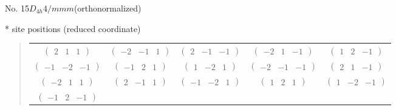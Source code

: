 \documentclass[fleqn,9pt,landscape]{jsarticle}
\begin{document}
\newpage
\begin{center}
\LARGE
No. 15\quad$D_{4h}$\quad$4/mmm$\quad[ tetragonal ] (orthonormalized)
\end{center}
\vspace{5mm}
* site positions (reduced coordinate)
\begin{quote}
\begin{tabular}{ccccc}
$ \begin{pmatrix} 2 & 1 & 1 \end{pmatrix} $ & $ \begin{pmatrix} -2 & -1 & 1 \end{pmatrix} $ & $ \begin{pmatrix} 2 & -1 & -1 \end{pmatrix} $ & $ \begin{pmatrix} -2 & 1 & -1 \end{pmatrix} $ & $ \begin{pmatrix} 1 & 2 & -1 \end{pmatrix} $ \\
$ \begin{pmatrix} -1 & -2 & -1 \end{pmatrix} $ & $ \begin{pmatrix} -1 & 2 & 1 \end{pmatrix} $ & $ \begin{pmatrix} 1 & -2 & 1 \end{pmatrix} $ & $ \begin{pmatrix} -2 & -1 & -1 \end{pmatrix} $ & $ \begin{pmatrix} 2 & 1 & -1 \end{pmatrix} $ \\
$ \begin{pmatrix} -2 & 1 & 1 \end{pmatrix} $ & $ \begin{pmatrix} 2 & -1 & 1 \end{pmatrix} $ & $ \begin{pmatrix} -1 & -2 & 1 \end{pmatrix} $ & $ \begin{pmatrix} 1 & 2 & 1 \end{pmatrix} $ & $ \begin{pmatrix} 1 & -2 & -1 \end{pmatrix} $ \\
$ \begin{pmatrix} -1 & 2 & -1 \end{pmatrix} $ & $  $ & $  $ & $  $ & $  $
\end{tabular}
\end{quote}
\end{document}
